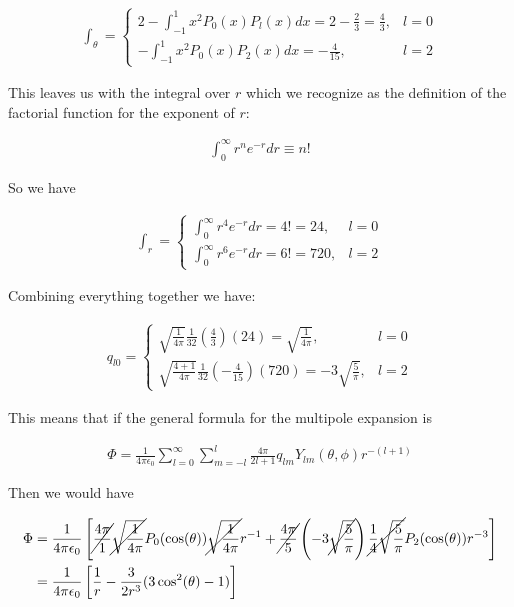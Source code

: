\documentclass[paper=a4, fontsize=11pt]{scrartcl} %
\newcommand{\kay}{\frac{1}{4 \pi \epsilon_0}}
\numberwithin{equation}{section} %
\numberwithin{figure}{section} %
\numberwithin{table}{section} %
\begin{document}
\begin{align}
\int_{\theta} = 
\begin{cases}
2 - \int_{-1}^1 x^2 P_0(x)P_l(x)dx = 2 - \frac{2}{3} = \frac{4}{3}, & l=0 \\
-\int_{-1}^1 x^2 P_0(x)P_2(x)dx = -\frac{4}{15}, & l=2  
\end{cases}
\end{align} 

This leaves us with the integral over $r$ which we recognize as the definition of the factorial function for the exponent of $r$:

\begin{align}
\int_0^{\infty}r^n e^{-r}dr \equiv n!
\end{align} 
 
So we have 

\begin{align}
\int_r = 
\begin{cases}
\int_0^{\infty}r^4e^{-r}dr = 4! = 24, & l=0 \\
\int_0^{\infty}r^6e^{-r}dr = 6! = 720, & l=2
\end{cases}
\end{align}

Combining everything together we have:

\begin{align}
q_{l0} = 
\begin{cases}
\sqrt{\frac{1}{4\pi}}\frac{1}{32}\left(\frac{4}{3}\right)(24) = \sqrt{\frac{1}{4\pi}}, & l=0 \\
\sqrt{\frac{4 + 1}{4\pi}}\frac{1}{32}\left(-\frac{4}{15}\right)(720) = -3\sqrt{\frac{5}{\pi}}, & l=2
\end{cases}
\end{align} 

This means that if the general formula for the multipole expansion is 

\begin{align}
\Phi = \kay \sum_{l=0}^{\infty}\sum_{m=-l}^{l}\frac{4\pi}{2l + 1}q_{lm}Y_{lm}(\theta,\phi)r^{-(l+1)}
\end{align}

Then we would have 

\begin{align}
\Phi &= \kay \left[\cancel{\frac{4\pi}{1}}\cancel{\sqrt{\frac{1}{4 \pi}}}P_0(\cos(\theta))\cancel{\sqrt{\frac{1}{4\pi}}}r^{-1} + \cancel{\frac{4\pi}{5}}\left(-3\cancel{\sqrt{\frac{5}{\pi}}}\right)\cancel{\frac{1}{4}\sqrt{\frac{5}{\pi}}}P_2(\cos(\theta))r^{-3}  \right] \\
&= \kay \left[\frac{1}{r} - \frac{3}{2r^3}(3\cos^2(\theta) - 1)\right]
\end{align}
\end{document}
